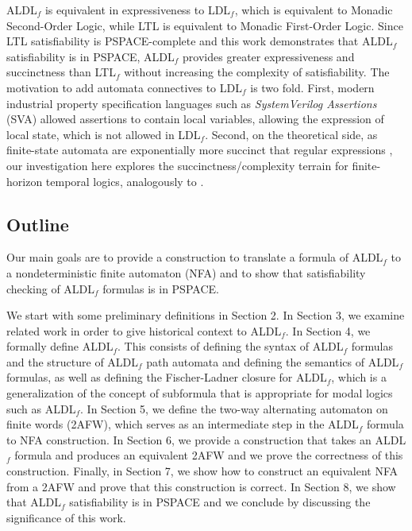 \documentclass[10pt,a4paper]{amsart}
\theoremstyle{plain}
\theoremstyle{definition}
\theoremstyle{definition}
\DeclareMathOperator{\?}{?}
\begin{document}
ALDL$_f$ is equivalent in expressiveness to LDL$_f$, which is equivalent to Monadic Second-Order Logic, while LTL is equivalent to Monadic First-Order Logic. Since LTL satisfiability is PSPACE-complete and this work demonstrates that ALDL$_f$ satisfiability is in PSPACE, ALDL$_f$ provides greater expressiveness and succinctness than LTL$_f$ without increasing the complexity of satisfiability.
The motivation to add automata connectives to LDL$_f$ is two fold.
First, modern industrial property specification languages such as \emph{SystemVerilog Assertions} (SVA) allowed assertions to contain local variables, allowing the expression of local state, which is not allowed in LDL$_f$. Second, on the theoretical side, as finite-state automata are exponentially more succinct that regular expressions \cite{gruber2}, our investigation here explores the succinctness/complexity terrain for finite-horizon temporal logics, analogously to \cite{vardi-wolper}.

\subsection{Outline}

Our main goals are to provide a construction to translate a formula of ALDL$_f$ to a nondeterministic finite automaton (NFA) and to show that satisfiability checking of ALDL$_f$ formulas is in PSPACE.

We start with some preliminary definitions in Section 2. In Section 3, we examine related work in order to give historical context to ALDL$_f$. In Section 4, we formally define ALDL$_f$. This consists of defining the syntax of ALDL$_f$ formulas and the structure of ALDL$_f$ path automata and defining the semantics of ALDL$_f$ formulas, as well as defining the Fischer-Ladner closure for ALDL$_f$, which is a generalization of the concept of subformula that is appropriate for modal logics such as ALDL$_f$. In Section 5, we define the two-way alternating automaton on finite words (2AFW), which serves as an intermediate step in the ALDL$_f$ formula to NFA construction. In Section 6, we provide a construction that takes an ALDL$_f$ formula and produces an equivalent 2AFW and we prove the correctness of this construction. Finally, in Section 7, we show how to construct an equivalent NFA from a 2AFW and prove that this construction is correct. In Section 8, we show that ALDL$_f$ satisfiability is in PSPACE and we conclude by discussing the significance of this work.
\end{document}
